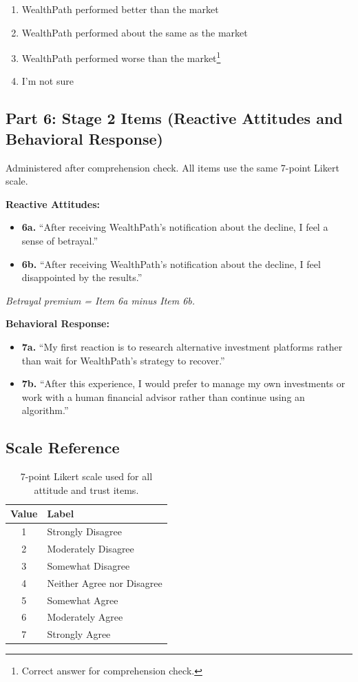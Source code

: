 \begin{enumerate}[label=\arabic*.]
  \item WealthPath performed better than the market
  \item WealthPath performed about the same as the market
  \item WealthPath performed worse than the market\footnote{Correct answer for comprehension check.}
  \item I'm not sure
\end{enumerate}

\subsection{Part 6: Stage 2 Items (Reactive Attitudes and Behavioral Response)}

Administered after comprehension check. All items use the same 7-point Likert scale.

\medskip
\noindent\textbf{Reactive Attitudes:}

\begin{itemize}[label={}]
  \item \textbf{6a.} ``After receiving WealthPath's notification about the decline, I feel a sense of betrayal.''
  \item \textbf{6b.} ``After receiving WealthPath's notification about the decline, I feel disappointed by the results.''
\end{itemize}

\noindent\textit{Betrayal premium = Item 6a minus Item 6b.}

\medskip
\noindent\textbf{Behavioral Response:}

\begin{itemize}[label={}]
  \item \textbf{7a.} ``My first reaction is to research alternative investment platforms rather than wait for WealthPath's strategy to recover.''
  \item \textbf{7b.} ``After this experience, I would prefer to manage my own investments or work with a human financial advisor rather than continue using an algorithm.''
\end{itemize}

\subsection{Scale Reference}

\begin{table}[ht]
\centering
\caption{7-point Likert scale used for all attitude and trust items.}
\label{tab:likert_scale}
\begin{tabular}{cl}
\toprule
Value & Label \\
\midrule
1 & Strongly Disagree \\
2 & Moderately Disagree \\
3 & Somewhat Disagree \\
4 & Neither Agree nor Disagree \\
5 & Somewhat Agree \\
6 & Moderately Agree \\
7 & Strongly Agree \\
\bottomrule
\end{tabular}
\end{table}
